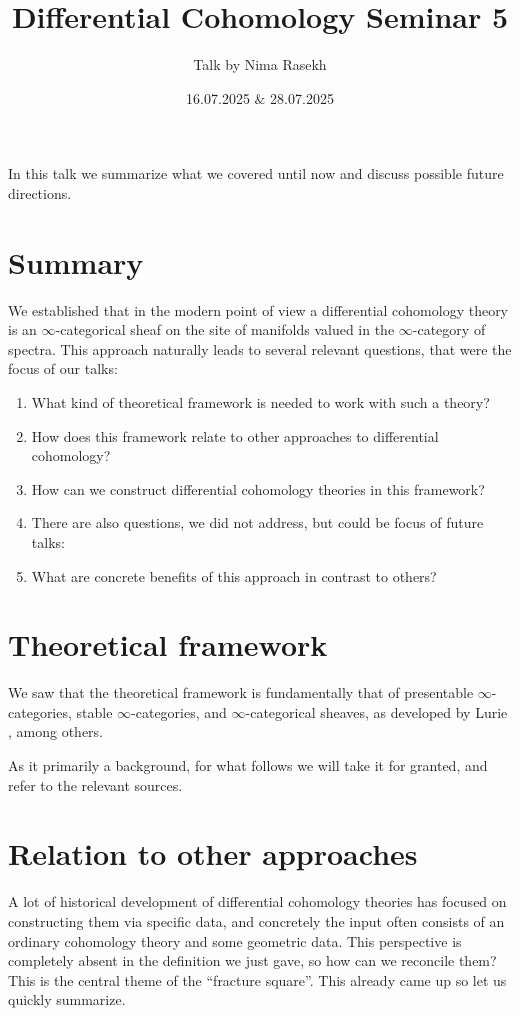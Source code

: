 \documentclass[10pt]{amsart}
\title{Differential Cohomology Seminar 5}
\date{16.07.2025 $\&$ 28.07.2025}
\author{Talk by Nima Rasekh}
\theoremstyle{definition}
\theoremstyle{remark}
\numberwithin{equation}{section}
\begin{document}
\maketitle

In this talk we summarize what we covered until now and discuss possible future directions.

\section {Summary}
We established that in the modern point of view a differential cohomology theory is an $\infty$-categorical sheaf on the site of manifolds valued in the $\infty$-category of spectra. This approach naturally leads to several relevant questions, that were the focus of our talks:
\begin{enumerate}
  \item What kind of theoretical framework is needed to work with such a theory?
  \item How does this framework relate to other approaches to differential cohomology?
  \item How can we construct differential cohomology theories in this framework?
  \item[] There are also questions, we did not address, but could be focus of future talks:
  \item What are concrete benefits of this approach in contrast to others?
\end{enumerate} 

\section{Theoretical framework}
We saw that the theoretical framework is fundamentally that of presentable $\infty$-categories, stable $\infty$-categories, and $\infty$-categorical sheaves, as developed by Lurie \cite{lurie2009htt}, among others. 

As it primarily a background, for what follows we will take it for granted, and refer to the relevant sources.

\section{Relation to other approaches}
A lot of historical development of differential cohomology theories has focused on constructing them via specific data, and concretely the input often consists of an ordinary cohomology theory and some geometric data. This perspective is completely absent in the definition we just gave, so how can we reconcile them? This is the central theme of the ``fracture square''. This already came up so let us quickly summarize.
\end{document}
